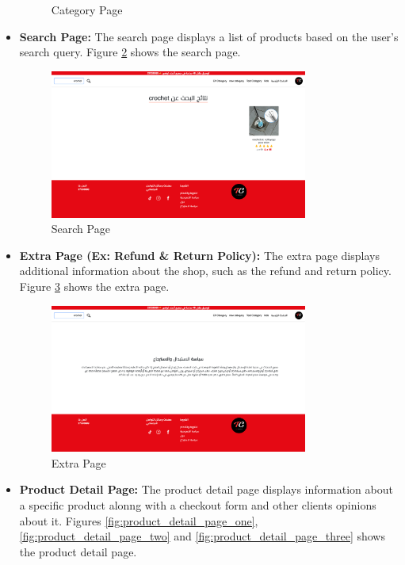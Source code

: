 \begin{itemize}
\begin{figure}[H]
        \caption{Category Page}
        \label{fig:category_page}
    \end{figure}
    \item \textbf{Search Page:} The search page displays a list of products based on the user's search query. Figure \ref{fig:search_page} shows the search page.
    \begin{figure}[H]
        \centering
        \includegraphics[width=0.8\textwidth]{images/searchPage.png}
        \caption{Search Page}
        \label{fig:search_page}
    \end{figure}
    \item \textbf{Extra Page (Ex: Refund \& Return Policy):} The extra page displays additional information about the shop, such as the refund and return policy. Figure \ref{fig:extra_page} shows the extra page.
    \begin{figure}[H]
        \centering
        \includegraphics[width=0.8\textwidth]{images/extra_page.png}
        \caption{Extra Page}
        \label{fig:extra_page}
    \end{figure}
    \item \textbf{Product Detail Page:} The product detail page displays information about a specific product alonng with a checkout form and other clients opinions about it. Figures \ref{fig:product_detail_page_one}, \ref{fig:product_detail_page_two} and \ref{fig:product_detail_page_three} shows the product detail page.

\end{itemize}

